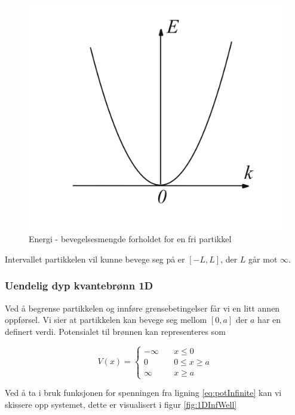 \begin{figure}[!htb]
    \centering
    \includegraphics[scale=0.25]{Bilder/SamtaleTema2/FreeParticleEnergy.jpg}
    \caption{Energi - bevegelsesmengde forholdet for en fri partikkel}
    \label{fig:parabola}
\end{figure}

Intervallet partikkelen vil kunne bevege seg på er $[-L,L]$, der $L$ går mot $\infty$.

\subsubsection{Uendelig dyp kvantebrønn 1D}
Ved å begrense partikkelen og innføre grensebetingelser får vi en litt annen oppførsel. Vi sier at partikkelen kan bevege seg mellom $[0,a]$ der $a$ har en definert verdi. Potensialet til brønnen kan representeres som

\begin{equation}
\label{eq:potInfinite}
V(x) = \left\{
        \begin{array}{ll}
            -\infty & \quad x \leq 0 \\
            0 & \quad 0 \leq x \geq a \\
            \infty & \quad x \geq a
        \end{array}
    \right.
\end{equation}

Ved å ta i bruk funksjonen for spenningen fra ligning \ref{eq:potInfinite} kan vi skissere opp systemet, dette er visualisert i figur \ref{fig:1DInfWell}

